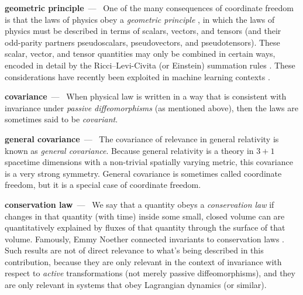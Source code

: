 \documentclass{article}
\renewcommand{\paragraph}[1]{\par\textbf{#1}~---~}
\begin{document}
\paragraph{geometric principle}
One of the many consequences of coordinate freedom is that the laws of physics obey a \emph{geometric principle} \cite{mcp}, in which the laws of physics must be described in terms of scalars, vectors, and tensors (and their odd-parity partners pseudoscalars, pseudovectors, and pseudotensors).
These scalar, vector, and tensor quantities may only be combined in certain ways, encoded in detail by the Ricci--Levi-Civita (or Einstein) summation rules \cite{ricci, einsteinsummation}.
These considerations have recently been exploited in machine learning contexts \cite{villar2021scalars}.

\paragraph{covariance}
When physical law is written in a way that is consistent with invariance under \emph{passive diffeomorphisms} (as mentioned above), then the laws are sometimes said to be \emph{covariant}.

\paragraph{general covariance}
The covariance of relevance in general relativity \cite{einstein} is known as \emph{general covariance}.
Because general relativity is a theory in $3+1$ spacetime dimensions with a non-trivial spatially varying metric, this covariance is a very strong symmetry.
General covariance is sometimes called coordinate freedom, but it is a special case of coordinate freedom.

\paragraph{conservation law}
We say that a quantity obeys a \emph{conservation law} if changes in that quantity (with time) inside some small, closed volume can are quantitatively explained by fluxes of that quantity through the surface of that volume.
Famously, Emmy Noether connected invariants to conservation laws \cite{noether}.
Such results are not of direct relevance to what's being described in this contribution, because they are only relevant in the context of invariance with respect to \emph{active} transformations (not merely passive diffeomorphisms), and they are only relevant in systems that obey Lagrangian dynamics (or similar).
\end{document}
